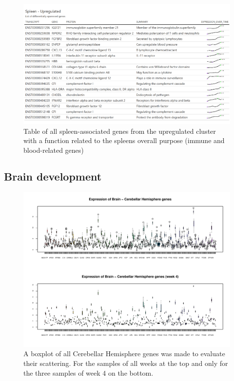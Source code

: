 \documentclass[
]{article}
\begin{document}
\begin{figure}
\centering
\includegraphics{final_report_files/figure-latex/spleen-up-table-1.pdf}
\caption{\label{fig:spleen-up-table}Table of all spleen-associated genes from the upregulated cluster with a function related to the spleens overall purpose (immune and blood-related genes)}
\end{figure}

\hypertarget{brain-development}{%
\subsection{Brain development}\label{brain-development}}

\begin{figure}
\centering
\includegraphics{final_report_files/figure-latex/boxplot-Cerebral-Hemisphere-1.pdf}
\caption{\label{fig:boxplot-Cerebral-Hemisphere}A boxplot of all Cerebellar Hemisphere genes was made to evaluate their scattering. For the samples of all weeks at the top and only for the three samples of week 4 on the bottom.}
\end{figure}
\end{document}
